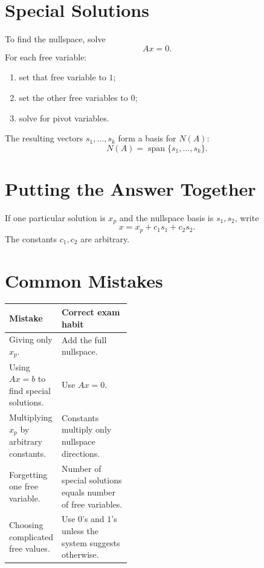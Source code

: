 \documentclass[10pt]{article}
\begin{document}
\section{Special Solutions}

To find the nullspace, solve
\[
Ax=0.
\]
For each free variable:
\begin{enumerate}
  \item set that free variable to \(1\);
  \item set the other free variables to \(0\);
  \item solve for pivot variables.
\end{enumerate}

The resulting vectors \(s_1,\ldots,s_k\) form a basis for \(N(A)\):
\[
N(A)=\operatorname{span}\{s_1,\ldots,s_k\}.
\]

\section{Putting the Answer Together}

If one particular solution is \(x_p\) and the nullspace basis is \(s_1,s_2\), write
\[
x=x_p+c_1s_1+c_2s_2.
\]
The constants \(c_1,c_2\) are arbitrary.


\section{Common Mistakes}

\begin{center}
\small
\begin{tabularx}{\linewidth}{@{}L{0.40\linewidth}Y@{}}
\toprule
Mistake & Correct exam habit \\
\midrule
Giving only \(x_p\). & Add the full nullspace. \\
Using \(Ax=b\) to find special solutions. & Use \(Ax=0\). \\
Multiplying \(x_p\) by arbitrary constants. & Constants multiply only nullspace directions. \\
Forgetting one free variable. & Number of special solutions equals number of free variables. \\
Choosing complicated free values. & Use \(0\)'s and \(1\)'s unless the system suggests otherwise. \\
\bottomrule
\end{tabularx}
\end{center}
\end{document}
